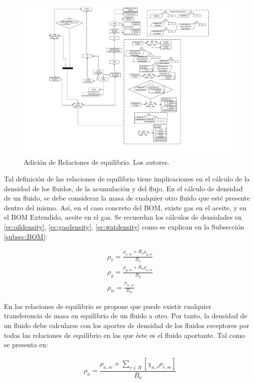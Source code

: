 \begin{figure}[h]
	\centering%
	\includegraphics[width=0.9\linewidth]{Fig/Equilibrium.pdf}%
	\caption[Adición de Relaciones de equilibrio.]{Adición de Relaciones de equilibrio. Los autores.} \label{fig:EqRelation}
\end{figure}

Tal definición de las relaciones de equilibrio tiene implicaciones en el cálculo de la densidad de los fluidos, de la acumulación y del flujo. En el cálculo de densidad de un fluido, se debe considerar la masa de cualquier otro fluido que esté presente dentro del mismo. Así, en el caso concreto del BOM, existe gas en el aceite, y en el BOM Extendido,
aceite en el gas. Se recuerdan los cálculos de densidades en \ref{ec:oildensity}, \ref{ec:gasdensity}, \ref{ec:watdensity} como se explican en la Subsección \ref{subsec:BOM}:

\begin{align*}
&\rho_{o} = \frac{\rho_{o,sc} + R_{s}\rho_{g,sc}}{B_{o}}\\
&\rho_{g} = \frac{\rho_{g,sc} + R_{v}\rho_{o,sc}}{B_{g}}\\
&\rho_{w} = \frac{\rho_{w,sc}}{B_{w}}
\end{align*}

En las relaciones de equilibrio se propone que puede existir cualquier transferencia de masa en equilibrio de un fluido a otro. Por tanto, la densidad de un fluido debe calcularse con los aportes de densidad de los fluidos receptores por todas las relaciones de equilibrio en las que éste es el fluido aportante. Tal como se presenta en:

\begin{align}
	\label{ec:generaldensity}&\rho_{a} = \dfrac{\rho_{a,sc} + \sum_{r \in R}\left[\chi_{a,r}\rho_{r,sc}\right]}{B_{a}}
\end{align}


